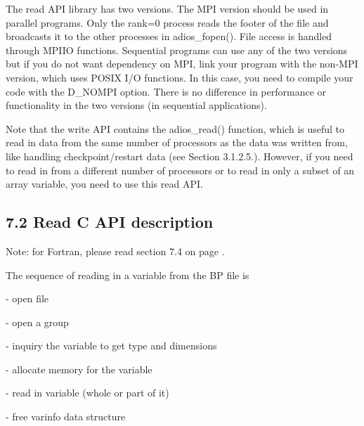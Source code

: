 \vspace{10pt}
\leftskip=0pt
The read API library has two versions. The MPI version should be used in parallel 
programs. Only the rank=0 process reads the footer of the file and broadcasts it 
to the other processes in adios\_fopen(). File access is handled through MPI\-{}IO 
functions. Sequential programs can use any of the two versions but if you do not 
want dependency on MPI, link your program with the non-MPI version, which uses 
POSIX I/O functions. In this case, you need to compile your code with the \-{}D\_NOMPI 
option. There is no difference in performance or functionality in the two versions 
(in sequential applications). 

\vspace{10pt}
Note that the write API contains the adios\_read() function, which is useful to 
read in data from the same number of processors as the data was written from, like 
handling checkpoint/restart data (see Section 3.1.2.5.). However, if you need to 
read in from a different number of processors or to read in only a subset of an 
array variable, you need to use this read API.\label{HToc182553398}

\vspace{10pt}
\subsection*{{\large 7.2 }{\large \textbf{Read C API description}}}

\vspace{10pt}
Note: for Fortran, please read section 7.4 on page \pageref{HRef144348801}.

\vspace{10pt}
The sequence of reading in a variable from the BP file is

\vspace{10pt}
- open file

\vspace{10pt}
- open a group

\vspace{10pt}
- inquiry the variable to get type and dimensions

\vspace{10pt}
- allocate memory for the variable

\vspace{10pt}
- read in variable (whole or part of it)

\vspace{10pt}
- free varinfo data structure

